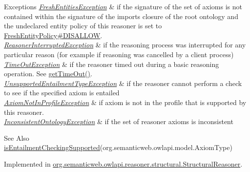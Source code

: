\begin{DoxyExceptions}{Exceptions}
{\em \hyperlink{classorg_1_1semanticweb_1_1owlapi_1_1reasoner_1_1_fresh_entities_exception}{Fresh\-Entities\-Exception}} & if the signature of the set of axioms is not contained within the signature of the imports closure of the root ontology and the undeclared entity policy of this reasoner is set to \hyperlink{enumorg_1_1semanticweb_1_1owlapi_1_1reasoner_1_1_fresh_entity_policy_a762eae6d5b2449d125311ecaabfdc8d0}{Fresh\-Entity\-Policy\#\-D\-I\-S\-A\-L\-L\-O\-W}. \\
\hline
{\em \hyperlink{classorg_1_1semanticweb_1_1owlapi_1_1reasoner_1_1_reasoner_interrupted_exception}{Reasoner\-Interrupted\-Exception}} & if the reasoning process was interrupted for any particular reason (for example if reasoning was cancelled by a client process) \\
\hline
{\em \hyperlink{classorg_1_1semanticweb_1_1owlapi_1_1reasoner_1_1_time_out_exception}{Time\-Out\-Exception}} & if the reasoner timed out during a basic reasoning operation. See \hyperlink{interfaceorg_1_1semanticweb_1_1owlapi_1_1reasoner_1_1_o_w_l_reasoner_a44b2c968f989afe5290db29c90faa164}{get\-Time\-Out()}. \\
\hline
{\em \hyperlink{classorg_1_1semanticweb_1_1owlapi_1_1reasoner_1_1_unsupported_entailment_type_exception}{Unsupported\-Entailment\-Type\-Exception}} & if the reasoner cannot perform a check to see if the specified axiom is entailed \\
\hline
{\em \hyperlink{classorg_1_1semanticweb_1_1owlapi_1_1reasoner_1_1_axiom_not_in_profile_exception}{Axiom\-Not\-In\-Profile\-Exception}} & if {\ttfamily axiom} is not in the profile that is supported by this reasoner. \\
\hline
{\em \hyperlink{classorg_1_1semanticweb_1_1owlapi_1_1reasoner_1_1_inconsistent_ontology_exception}{Inconsistent\-Ontology\-Exception}} & if the set of reasoner axioms is inconsistent \\
\hline
\end{DoxyExceptions}
\begin{DoxySeeAlso}{See Also}
\hyperlink{interfaceorg_1_1semanticweb_1_1owlapi_1_1reasoner_1_1_o_w_l_reasoner_ada02e7fc9aed4a3df8c0bfecc3917aa9}{is\-Entailment\-Checking\-Supported}(org.\-semanticweb.\-owlapi.\-model.\-Axiom\-Type) 
\end{DoxySeeAlso}


Implemented in \hyperlink{classorg_1_1semanticweb_1_1owlapi_1_1reasoner_1_1structural_1_1_structural_reasoner_a0a5750c03d947cf9ba92cbbde2e213e7}{org.\-semanticweb.\-owlapi.\-reasoner.\-structural.\-Structural\-Reasoner}.

